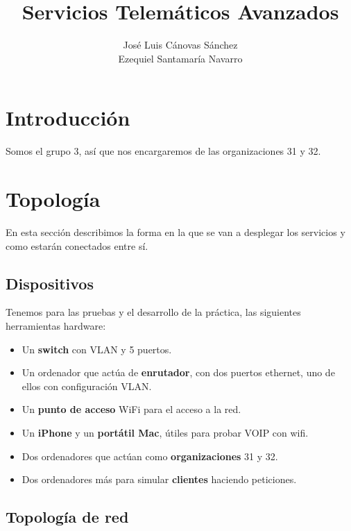\documentclass[]{article}
\title{Servicios Telemáticos Avanzados}
\author{José Luis Cánovas Sánchez\\Ezequiel Santamaría Navarro}
\begin{document}
\maketitle

\begin{abstract}
\end{abstract}

\tableofcontents


\section{Introducción}

Somos el grupo 3, así que nos encargaremos de las organizaciones 31 y 32.

\section{Topología}

En esta sección describimos la forma en la que se van a desplegar los servicios y como estarán
conectados entre sí. 

\subsection{Dispositivos}

Tenemos para las pruebas y el desarrollo de la práctica, las siguientes herramientas hardware:

\begin{itemize}

	\item Un \textbf{switch} con VLAN y 5 puertos.
	\item Un ordenador que actúa de \textbf{enrutador}, con dos puertos ethernet, uno de ellos con configuración VLAN.
	\item Un \textbf{punto de acceso} WiFi para el acceso a la red.
	\item Un \textbf{iPhone} y un \textbf{portátil Mac}, útiles para probar VOIP con wifi.
	\item Dos ordenadores que actúan como \textbf{organizaciones} 31 y 32. 
	\item Dos ordenadores más para simular \textbf{clientes} haciendo peticiones.

\end{itemize}

\subsection{Topología de red}
\end{document}
